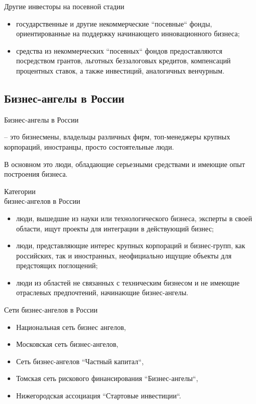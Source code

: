 \documentclass[_Venture_p2.tex]{subfiles}
\begin{document}
\begin{frame}[allowframebreaks]{Другие инвесторы на посевной стадии}{}
\begin{itemize}
	\item государственные и другие некоммерческие ``посевные`` фонды, ориентированные на поддержку начинающего инновационного бизнеса;
	\item средства из некоммерческих ``посевных`` фондов предоставляются посредством грантов, льготных беззалоговых кредитов, компенсаций процентных ставок, а также инвестиций, аналогичных венчурным.
\end{itemize}
\end{frame}

\subsection{Бизнес-ангелы в России}
\begin{frame}{Бизнес-ангелы  в России}
\begin{block}{}
	\quad
	 – это бизнесмены, владельцы различных фирм, топ-менеджеры крупных корпораций, иностранцы, просто состоятельные люди. 
	 
	 В основном это люди, обладающие серьезными средствами и имеющие опыт построения бизнеса.
\end{block}
\end{frame}

\begin{frame}[allowframebreaks]{Категории\\ бизнес-ангелов в России}{}
\begin{itemize}
	\item люди, вышедшие из науки или технологического бизнеса, эксперты в своей области, ищут проекты для интеграции в действующий бизнес;
	
	\pagebreak
	\item люди, представляющие интерес крупных корпораций и бизнес-групп, как российских, так и иностранных, неофициально ищущие объекты для предстоящих поглощений;
	\item люди из областей не связанных с техническим бизнесом и не имеющие отраслевых предпочтений, начинающие бизнес-ангелы.	
\end{itemize}
\end{frame}

\begin{frame}{Сети бизнес-ангелов в России}{}
\begin{itemize}
	\item Национальная сеть бизнес ангелов, 
	\item Московская сеть бизнес-ангелов, 
	\item Сеть бизнес-ангелов ``Частный капитал``, 
	\item Томская сеть рискового финансирования ``Бизнес-ангелы``,
	\item Нижегородская ассоциация ``Стартовые инвестиции``.
\end{itemize}
\end{frame}
\end{document}
